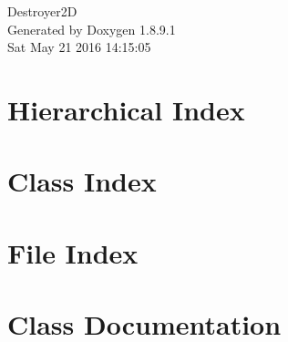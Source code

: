 \documentclass[twoside]{book}
\newcommand{\+}{\discretionary{\mbox{\scriptsize$\hookleftarrow$}}{}{}}
\newcommand{\clearemptydoublepage}{%
  \newpage{\pagestyle{empty}\cleardoublepage}%
}
\begin{document}
\hypersetup{pageanchor=false,
             bookmarks=true,
             bookmarksnumbered=true,
             pdfencoding=unicode
            }
\begin{titlepage}
\vspace*{7cm}
\begin{center}%
{\Large Destroyer2\+D }\\
\vspace*{1cm}
{\large Generated by Doxygen 1.8.9.1}\\
\vspace*{0.5cm}
{\small Sat May 21 2016 14:15:05}\\
\end{center}
\end{titlepage}
\clearemptydoublepage
\tableofcontents
\clearemptydoublepage
{}
\hypersetup{pageanchor=true}

\chapter{Hierarchical Index}

\chapter{Class Index}

\chapter{File Index}

\chapter{Class Documentation}






































\end{document}
